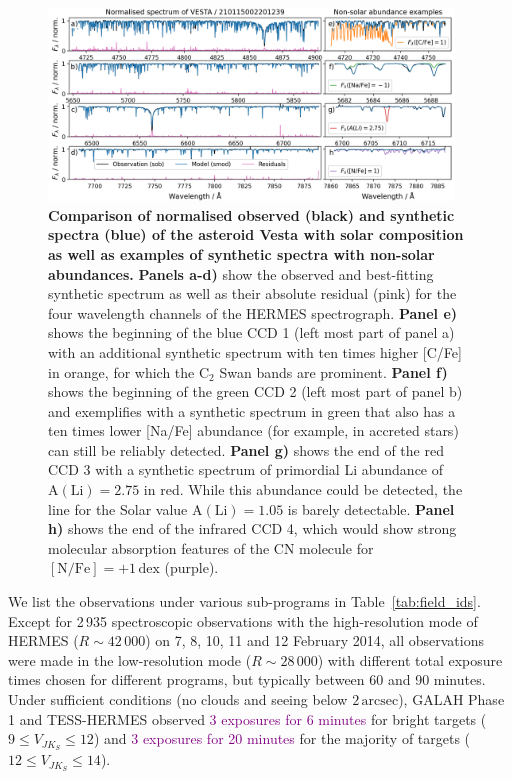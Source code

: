 \documentclass[
  journal=pasa,
  manuscript=research-paper, %
  year=2024,
  volume=37
]{cup-journal}
\newcommand{\adjusted}[1]{{\textcolor{purple}{#1}}}
\begin{document}
\begin{figure}[ht]
 \centering
 \includegraphics[width=0.96\textwidth]{figures/210115002201239_abundance_examples.png}
 \caption{\textbf{Comparison of normalised observed (black) and synthetic spectra (blue) of the asteroid Vesta with solar composition as well as examples of synthetic spectra with non-solar abundances.}
 \textbf{Panels a-d)} show the observed and best-fitting synthetic spectrum as well as their absolute residual (pink) for the four wavelength channels of the HERMES spectrograph.
 \textbf{Panel e)} shows the beginning of the blue CCD 1 (left most part of panel a) with an additional synthetic spectrum with ten times higher [C/Fe] in orange, for which the $\mathrm{C}_2$  Swan bands are prominent.
 \textbf{Panel f)} shows the beginning of the green CCD 2 (left most part of panel b) and exemplifies with a synthetic spectrum in green that also has a ten times lower [Na/Fe] abundance (for example, in accreted stars) can still be reliably detected. 
 \textbf{Panel g)} shows the end of the red CCD 3 with a synthetic spectrum of primordial Li abundance of $\mathrm{A(Li)} = 2.75$ in red. While this abundance could be detected, the line for the Solar value $\mathrm{A(Li)} = 1.05$ is barely detectable.
 \textbf{Panel h)} shows the end of the infrared CCD 4, which would show strong molecular absorption features of the CN molecule for $\mathrm{[N/Fe]} = +1\,\mathrm{dex}$ (purple).
 }
 \label{fig:210115002201239_abundance_examples}
\end{figure}

We list the observations under various sub-programs in Table~\ref{tab:field_ids}. Except for 2\,935 spectroscopic observations with the high-resolution mode of HERMES ($R \sim 42\,000$) on 7, 8, 10, 11 and 12 February 2014, all observations were made in the low-resolution mode ($R \sim 28\,000$) with different total exposure times chosen for different programs, but typically between 60 and 90 minutes. Under sufficient conditions (no clouds and seeing below $2\,\mathrm{arcsec}$), GALAH Phase 1 and TESS-HERMES observed \adjusted{3 exposures for 6 minutes} for bright targets ($9 \leq V_{JK_S} \leq 12$) and \adjusted{3 exposures for 20 minutes} for the majority of targets ($12 \leq V_{JK_S} \leq 14$).
\end{document}
